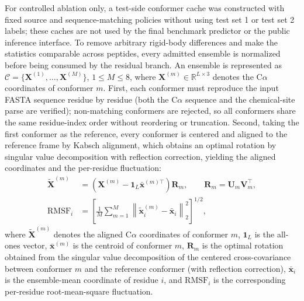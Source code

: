\documentclass[12pt]{article}
\begin{document}
For controlled ablation only, a test-side conformer cache was constructed
with fixed source and sequence-matching policies without using test set 1 or test set 2
labels; these caches are not used by the final benchmark predictor or the
public inference interface.
To remove arbitrary rigid-body differences and make the statistics comparable
across peptides, every admitted ensemble is normalized before being consumed
by the residual branch. An ensemble is represented as
$\mathcal{C} = \{\mathbf X^{(1)}, \ldots, \mathbf X^{(M)}\}$, $1 \leq M \leq
8$, where $\mathbf X^{(m)} \in \mathbb{R}^{L\times3}$ denotes the C$\alpha$
coordinates of conformer $m$. First, each conformer must reproduce the input
FASTA sequence residue by residue (both the C$\alpha$ sequence and the
chemical-site parse are verified); non-matching conformers are rejected, so
all conformers share the same residue-index order without reordering or
truncation. Second, taking the first conformer as the reference, every
conformer is centered and aligned to the reference frame by Kabsch alignment,
which obtains an optimal rotation by singular value decomposition with
reflection correction, yielding the aligned coordinates and the
per-residue fluctuation:
\begin{equation}
    \begin{split}
        \tilde{\mathbf X}^{(m)} &= \left(\mathbf X^{(m)} - \mathbf 1_L
        \bar{\mathbf x}^{(m)\top}\right)\mathbf R_m,
        \qquad \mathbf R_m = \mathbf U_m \mathbf V_m^{\top},\\
        \mathrm{RMSF}_i &= \left[\frac{1}{M}\sum_{m=1}^{M}
        \left\lVert \tilde{\mathbf x}_i^{(m)} - \bar{\mathbf x}_i
        \right\rVert_2^2\right]^{1/2},
    \end{split}
    \label{eq:conformer_align}
\end{equation}
where $\tilde{\mathbf X}^{(m)}$ denotes the aligned C$\alpha$ coordinates of
conformer $m$, $\mathbf 1_L$ is the all-ones vector, $\bar{\mathbf x}^{(m)}$
is the centroid of conformer $m$, $\mathbf R_m$ is the optimal rotation
obtained from the singular value decomposition of the centered
cross-covariance between conformer $m$ and the reference conformer (with
reflection correction), $\bar{\mathbf x}_i$ is the ensemble-mean coordinate of
residue $i$, and $\mathrm{RMSF}_i$ is the corresponding per-residue
root-mean-square fluctuation.
\end{document}
